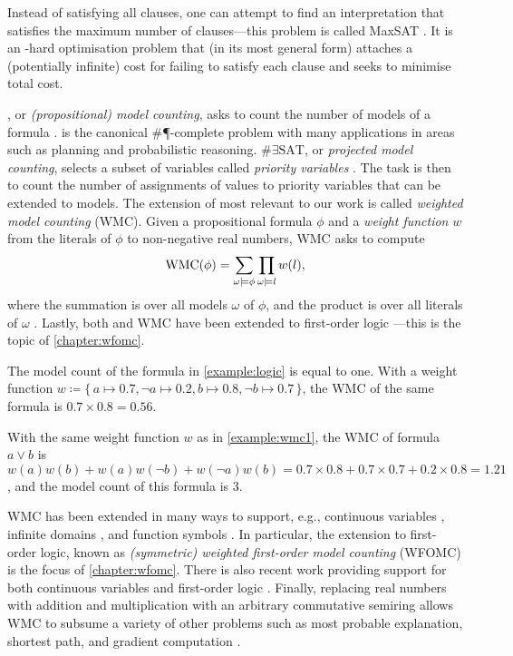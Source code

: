 Instead of satisfying all clauses, one can attempt to find an interpretation
that satisfies the maximum number of clauses---this problem is called MaxSAT
\citep{bacchus2021maximum,DBLP:series/faia/LiM09}. It is an \NP-hard
optimisation problem that (in its most general form) attaches a (potentially
infinite) cost for failing to satisfy each clause and seeks to minimise total
cost.

\mc{}, or \emph{(propositional) model counting}, asks to count the number of
models of a formula \citep{DBLP:series/faia/GomesSS09}. \mc{} is the canonical
\#\P-complete problem with many applications in areas such as planning and
probabilistic reasoning. $\#\exists\textrm{SAT}$, or \emph{projected model
  counting}, selects a subset of variables called \emph{priority variables}
\citep{DBLP:conf/sat/AzizCMS15}. The task is then to count the number of
assignments of values to priority variables that can be extended to models. The
extension of \mc{} most relevant to our work is called \emph{weighted model
  counting} (WMC). Given a propositional formula $\phi$ and a \emph{weight
  function} $w$ from the literals of $\phi$ to non-negative real numbers, WMC
asks to compute
\[
\operatorname{WMC}(\phi) = \sum_{\omega \models \phi} \prod_{\omega \models l} w(l),
\]
where the summation is over all models $\omega$ of $\phi$, and the product is
over all literals of $\omega$ \citep{DBLP:journals/ai/ChaviraD08}. Lastly, both
\mc{} and WMC have been extended to first-order logic
\citep{DBLP:conf/ijcai/BroeckTMDR11}---this is the topic of
\cref{chapter:wfomc}.

\begin{example}\label{example:wmc1}
  The model count of the formula in \cref{example:logic} is equal to one. With a
  weight function
  $w \coloneqq \{\, a \mapsto 0.7, \neg a \mapsto 0.2, b \mapsto 0.8, \neg b \mapsto 0.7 \,\}$,
  the WMC of the same formula is $0.7 \times 0.8 = 0.56$.
\end{example}

\begin{example}
  With the same weight function $w$ as in \cref{example:wmc1}, the WMC of
  formula $a \lor b$ is
  $w(a)w(b) + w(a)w(\neg b) + w(\neg a)w(b) = 0.7 \times 0.8 + 0.7 \times 0.7 + 0.2 \times 0.8 = 1.21$,
  and the model count of this formula is 3.
\end{example}

WMC has been extended in many ways to support, e.g., continuous variables
\citep{DBLP:conf/ijcai/BellePB15}, infinite domains
\citep{DBLP:conf/aaai/Belle17}, and function symbols
\citep{DBLP:conf/uai/Belle17}. In particular, the extension to first-order
logic, known as \emph{(symmetric) weighted first-order model counting} (WFOMC)
\citep{DBLP:journals/cacm/GogateD16,DBLP:conf/ijcai/BroeckTMDR11} is the focus
of \cref{chapter:wfomc}. There is also recent work providing support for both
continuous variables and first-order logic \citep{DBLP:conf/uai/FeldsteinB21}.
Finally, replacing real numbers with addition and multiplication with an
arbitrary commutative semiring allows WMC to subsume a variety of other problems
such as most probable explanation, shortest path, and gradient computation
\citep{DBLP:journals/ijar/BelleR20,DBLP:journals/japll/KimmigBR17}.

